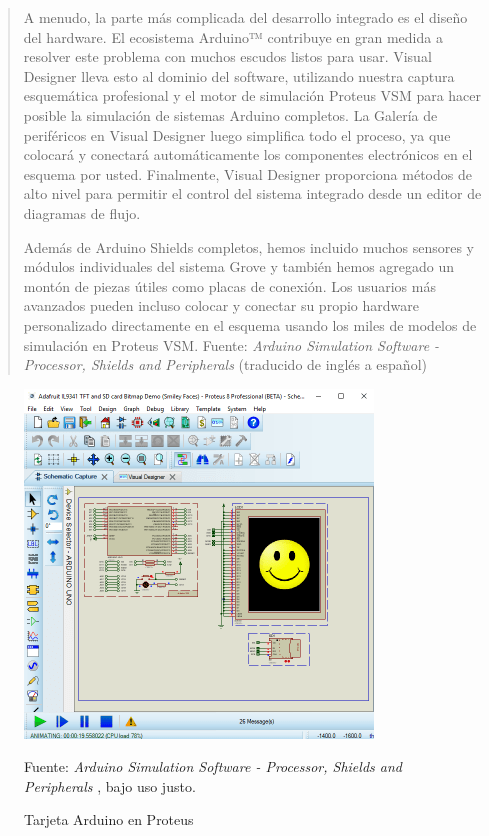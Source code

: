\documentclass{article}
\begin{document}
    \begin{quote}
        A menudo, la parte más complicada del desarrollo integrado es el
        diseño del hardware. El ecosistema Arduino™ contribuye en gran medida
        a resolver este problema con muchos escudos listos para usar. Visual
        Designer lleva esto al dominio del software, utilizando nuestra
        captura esquemática profesional y el motor de simulación Proteus VSM
        para hacer posible la simulación de sistemas Arduino completos. La
        Galería de periféricos en Visual Designer luego simplifica todo el
        proceso, ya que colocará y conectará automáticamente los componentes
        electrónicos en el esquema por usted. Finalmente, Visual Designer
        proporciona métodos de alto nivel para permitir el control del
        sistema integrado desde un editor de diagramas de flujo.

        \bigbreak

        Además de Arduino Shields completos, hemos incluido muchos sensores y
        módulos individuales del sistema Grove y también hemos agregado un
        montón de piezas útiles como placas de conexión. Los usuarios más
        avanzados pueden incluso colocar y conectar su propio hardware
        personalizado directamente en el esquema usando los miles de modelos
        de simulación en Proteus VSM.\bigbreak \footnotesize
        Fuente: \textit{Arduino Simulation Software - Processor, Shields and
        Peripherals} (traducido de inglés a español)
        \cite{labcenter-electronics-2022}
    \end{quote}

    \begin{figure}[H]
        \centering
        \includegraphics[width=0.3\paperwidth]{images/schematic.png}
        \caption{Tarjeta Arduino en Proteus}\footnotesize
        Fuente: \textit{Arduino Simulation Software - Processor, Shields and
        Peripherals} \cite{labcenter-electronics-2022}, bajo uso justo.
    \end{figure}
\end{document}
